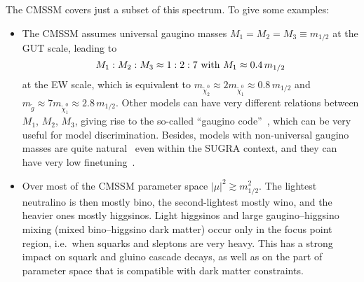 The CMSSM covers just a subset of this spectrum. To give some 
examples:

\begin{itemize}

\item The CMSSM assumes universal gaugino masses $M_1=M_2=M_3\equiv m_{1/2}$ 
at the GUT scale, leading to 
\begin{equation}
  M_1 : M_2 : M_3 \approx 1 : 2 : 7 ~{\rm with}~ M_1 \approx 0.4\,m_{1/2}
  \label{eq:gauginos}
\end{equation}
at the EW scale, which is equivalent to 
$m_{\tilde\chi^0_2}\approx 2m_{\tilde\chi^0_1}\approx 0.8\,m_{1/2}$ 
and $m_{\tilde g}\approx 7m_{\tilde\chi^0_1}\approx 2.8\,m_{1/2}$. 
Other models can have very different relations between 
$M_1$, $M_2$, $M_3$, giving rise to the so-called 
``gaugino code''~\cite{Choi:2007ka}, 
which can be very useful for model discrimination. Besides, models with 
non-universal gaugino masses are quite natural~\cite{Martin:2009ad} even 
within the SUGRA context, and they can have very low finetuning~\cite{Horton:2009ed}.

\item Over most of the CMSSM parameter space $|\mu|^2\gtrsim m_{1/2}^2$. 
The lightest neutralino is then mostly bino, the second-lightest mostly wino, 
and the heavier ones mostly higgsinos. Light higgsinos and large gaugino--higgsino 
mixing (mixed bino--higgsino dark matter) occur only in the focus point region, 
i.e.\ when squarks and sleptons are very heavy. This has a strong impact on 
squark and gluino cascade decays, as well as on the part of parameter 
space that is compatible with dark matter constraints. 


\end{itemize}
